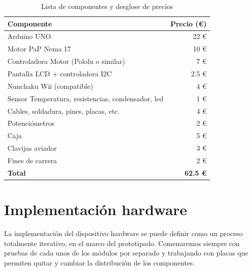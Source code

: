 \begin{itemize}
\begin{table}[h!]
	\centering
	
	\begin{tabular}{|l|r|}
		\hline
		\textbf{Componente}                  				& \textbf{Precio (\euro)} \\ \hline\hline
		Arduino UNO        									&                      22 \euro \\ \hline
		Motor PaP Nema 17         							&                      10 \euro \\ \hline
		Controladora Motor (Pololu o similar) 				&                      7  \euro \\ \hline
		Pantalla LCD + controladora I2C           			&                      2.5 \euro \\ \hline
		Nunchaku Wii (compatible)        					&                      4  \euro \\ \hline
	    Sensor Temperatura, resistencias, condensador, led  & 					   1  \euro \\ \hline
		Cables, soldadura, pines, placas, etc.               &                      4  \euro \\ \hline
		Potenciómetros            							&                      2  \euro \\ \hline 
		Caja            									&                      5  \euro \\ \hline 
		Clavijas aviador            						&                      3  \euro \\ \hline 
		Fines de carrera            						&                      2  \euro \\ \hline \hline
		\textbf{Total}                  					&            \textbf{62.5 \euro} \\ \hline
	\end{tabular} 
	\caption[Lista de componentes y costes]{Lista de componentes y desglose de precios}
	\label{tabla_costes_hardware}	
\end{table}


\section{Implementación hardware}

La implementación del dispositivo hardware se puede definir como un proceso totalmente iterativo, en el marco del prototipado. Comenaremos siempre con pruebas de cada unos de los módulos por separado y trabajando con placas que permiten quitar y cambiar la distribución de los componentes.


\end{itemize}
